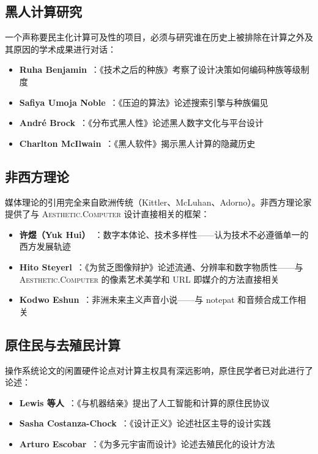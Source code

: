\documentclass[10pt,letterpaper,twocolumn]{article}
\newcommand{\ac}{\textsc{Aesthetic.Computer}}
\begin{document}
\subsection{黑人计算研究}

一个声称要民主化计算可及性的项目，必须与研究谁在历史上被排除在计算之外及其原因的学术成果进行对话：

\begin{itemize}
  \item \textbf{Ruha Benjamin}~\citep{benjamin2019race}：《技术之后的种族》考察了设计决策如何编码种族等级制度
  \item \textbf{Safiya Umoja Noble}~\citep{noble2018algorithms}：《压迫的算法》论述搜索引擎与种族偏见
  \item \textbf{Andr\'e Brock}~\citep{brock2020distributed}：《分布式黑人性》论述黑人数字文化与平台设计
  \item \textbf{Charlton McIlwain}~\citep{mcilwain2019black}：《黑人软件》揭示黑人计算的隐藏历史
\end{itemize}

\subsection{非西方理论}

媒体理论的引用完全来自欧洲传统（Kittler、McLuhan、Adorno）。非西方理论家提供了与 \ac{} 设计直接相关的框架：

\begin{itemize}
  \item \textbf{许煜（Yuk Hui）}~\citep{hui2016existence, hui2019recursion}：数字本体论、技术多样性——认为技术不必遵循单一的西方发展轨迹
  \item \textbf{Hito Steyerl}~\citep{steyerl2009poor}：《为贫乏图像辩护》论述流通、分辨率和数字物质性——与 \ac{} 的像素艺术美学和 URL 即媒介的方法直接相关
  \item \textbf{Kodwo Eshun}~\citep{eshun1998brilliant}：非洲未来主义声音小说——与 notepat 和音频合成工作相关
\end{itemize}

\subsection{原住民与去殖民计算}

操作系统论文的闲置硬件论点对计算主权具有深远影响，原住民学者已对此进行了论述：

\begin{itemize}
  \item \textbf{Lewis 等人}~\citep{lewis2018kin}：《与机器结亲》提出了人工智能和计算的原住民协议
  \item \textbf{Sasha Costanza-Chock}~\citep{costanza2020design}：《设计正义》论述社区主导的设计实践
  \item \textbf{Arturo Escobar}~\citep{escobar2018designs}：《为多元宇宙而设计》论述去殖民化的设计方法
\end{itemize}
\end{document}

